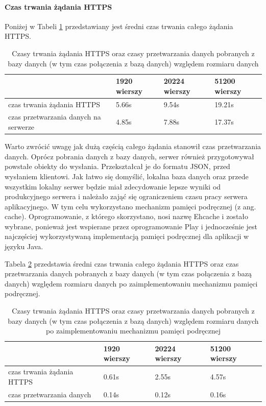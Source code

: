 \documentclass[a4paper,12pt,twoside]{article}
\begin{document}
\paragraph{Czas trwania żądania HTTPS}
Poniżej w Tabeli \ref{table:httpRequestTime} przedstawiany jest średni czas trwania całego żądania HTTPS.
\begin{table}[H]
\begin{tabular}{| p{3cm} | p{3cm} | p{3cm} | p{3cm}|}
\hline
& 1920 wierszy & 20224 wierszy & 51200 wierszy\\
\hline
czas trwania żądania HTTPS& 5.66s & 9.54s & 19.21s \\ \hline
czas przetwarzania danych na serwerze& 4.85s& 7.88s& 17.37s\\ \hline
\end{tabular}
\caption{Czasy trwania żądania HTTPS oraz czasy przetwarzania danych pobranych z bazy danych (w tym czas połączenia z bazą danych) względem rozmiaru danych }
\label{table:httpRequestTime}
\end{table}
Warto zwrócić uwagę jak dużą częścią całego żądania stanowił czas przetwarzania danych. Oprócz pobrania danych z bazy danych, serwer również przygotowywał
powstałe obiekty do wysłania. Przekształcał je do formatu JSON, przed wysłaniem
klientowi.
Jak łatwo się domyślić, lokalna baza danych oraz przede wszystkim lokalny serwer będzie miał zdecydowanie lepsze wyniki od produkcyjnego serwera i należało
zająć się ograniczeniem czasu pracy serwera aplikacyjnego.
W tym celu wykorzystano mechanizm pamięci podręcznej (z ang. cache).
Oprogramowanie, z którego skorzystano, nosi nazwę Ehcache \cite{cache} i
zostało wybrane, ponieważ jest wspierane przez oprogramowanie Play
i jednocześnie jest najczęściej wykorzystywaną implementacją pamięci podręcznej
dla aplikacji w języku Java.

Tabela \ref{table:httpRequestTimeCache} przedstawia średni czas trwania
całego żądania HTTPS oraz czas przetwarzania danych pobranych z bazy danych
(w tym czas połączenia z bazą danych) względem rozmiaru danych po zaimplementowaniu
mechanizmu pamięci podręcznej.
\begin{table} [H]
\begin{tabular}{| p{3cm} | p{3cm} | p{3cm} | p{3cm}|}
\hline
& 1920 wierszy & 20224 wierszy & 51200 wierszy\\
\hline
czas trwania żądania HTTPS& 0.61s & 2.55s& 4.57s \\ \hline
czas przetwarzania danych& 0.14s& 0.12s& 0.16s\\ \hline
\end{tabular}
\caption{Czasy trwania żądania HTTPS oraz czasy przetwarzania danych pobranych z bazy danych (w tym czas połączenia z bazą danych) względem rozmiaru danych po zaimplementowaniu mechanizmu pamięci podręcznej}
\label{table:httpRequestTimeCache}
\end{table}
\end{document}
